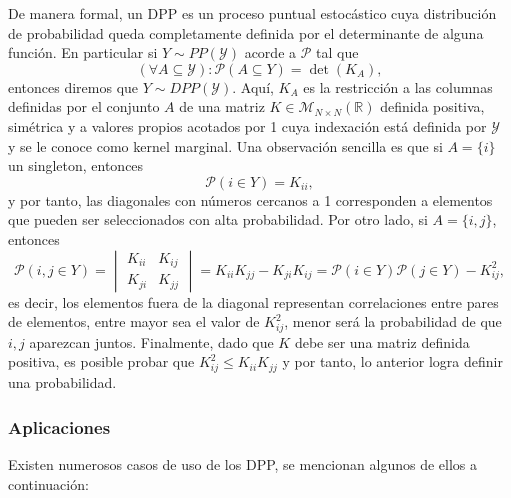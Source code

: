 De manera formal, un DPP es un proceso puntual estocástico cuya distribución de probabilidad queda completamente definida por el determinante de alguna función. En particular si $Y \sim PP(\mathcal{Y})$ acorde a $\mathcal{P}$ tal que 
\[ (\forall A \subseteq \mathcal{Y}): \mathcal{P}(A \subseteq Y) = \det(K_A) ,  \]
entonces diremos que $Y \sim DPP(\mathcal{Y})$. Aquí, $K_A$ es la restricción a las columnas definidas por el conjunto $A$ de una matriz $K \in \mathcal{M}_{N \times N} (\mathbb{R})$ definida positiva, simétrica y a valores propios acotados por 1 cuya indexación está definida por $\mathcal{Y}$ y se le conoce como kernel marginal. Una observación sencilla es que si $A = \{i\}$ un singleton, entonces 
\[ \mathcal{P}(i \in Y) = K_{ii} ,  \]
y por tanto, las diagonales con números cercanos a 1 corresponden a elementos que pueden ser seleccionados con alta probabilidad. Por otro lado, si $A = \{i,j\}$, entonces
	\[
	\mathcal{P}(i,j \in Y) = \begin{vmatrix}
    K_{ii} & K_{ij} \\ 
    K_{ji} & K_{jj}
    \end{vmatrix} = K_{ii}K_{jj} - K_{ji}K_{ij} = \mathcal{P}(i \in Y)\mathcal{P}(j \in Y) - K_{ij}^2 , 
	\] es decir, los elementos fuera de la diagonal representan correlaciones entre pares de elementos, entre mayor sea el valor de $K_{ij}^2$, menor será la probabilidad de que $i,j$ aparezcan juntos. Finalmente, dado que $K$ debe ser una matriz definida positiva, es posible probar que $K_{ij}^2 \leq K_{ii}K_{jj}$ y por tanto, lo anterior logra definir una probabilidad. 

\subsubsection{Aplicaciones }

Existen numerosos casos de uso de los DPP, se mencionan algunos de ellos a continuación: 

